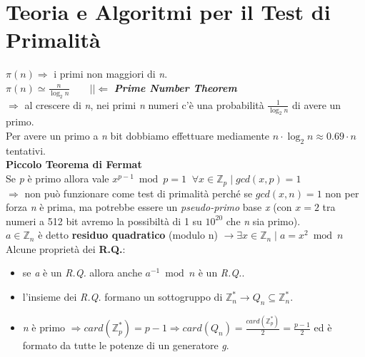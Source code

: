 \section{Teoria e Algoritmi per il Test di Primalità}
$\pi(n) \Rightarrow$ i primi  non maggiori di \textit{n}. \\
$\pi(n) \simeq \frac{n}{\log_{2}{n}} \qquad || \Leftarrow$ \textbf{\textit{Prime Number Theorem}} \\
$\Rightarrow$ al crescere di \textit{n}, nei primi \textit{n} numeri c'è una probabilità $\frac{1}{\log_{2}{n}}$ di avere un primo. \\
Per avere un primo a \textit{n} bit dobbiamo effettuare mediamente $n \cdot \log_{2}{n} \approx 0.69 \cdot n$ tentativi.
\\ \newline
\textbf{Piccolo Teorema di Fermat} \\
Se \textit{p} è primo allora vale $x^{p - 1} \bmod p = 1 \;\; \forall x \in \mathbb{Z}_p \; | \; gcd(x, p) = 1$ \\
$\Rightarrow$ non può funzionare come test di primalità perché se $gcd(x, n) = 1$ non per forza \textit{n} è prima, ma potrebbe essere un \textit{pseudo-primo} base \textit{x} (con $x = 2$ tra numeri a 512 bit avremo la possibiltà di 1 su $10^{20}$ che \textit{n} sia primo).
\\
$a \in \mathbb{Z}_n$ è detto \textbf{residuo quadratico} (modulo n) $\rightarrow \exists x \in \mathbb{Z}_n \; | \; a = x^2 \bmod n$ \\
Alcune proprietà dei \textbf{R.Q.}:
\begin{itemize}
    \item se \textit{a} è un \textit{R.Q.} allora anche $a^{-1} \bmod n$ è un \textit{R.Q.}.
    \item l'insieme dei \textit{R.Q.} formano un sottogruppo di $\mathbb{Z}_n^* \rightarrow Q_n \subseteq \mathbb{Z}_n^*$.
    \item \textit{n} è primo $\Rightarrow card(\mathbb{Z}_p^*) = p - 1 \Rightarrow card(Q_n) = \frac{card(\mathbb{Z}_p^*)}{2} = \frac{p - 1}{2}$ ed è formato da tutte le potenze di un generatore \textit{g}.
\end{itemize}

